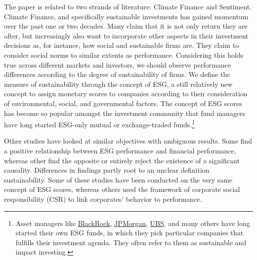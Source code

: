 \documentclass[11pt]{article}
\begin{document}
The paper is related to two strands of literature: Climate Finance and Sentiment. Climate Finance, and specifically sustainable investments has gained momentum over the past one or two decades. Many claim that it is not only return they are after, but increasingly also want to incorporate other aspects in their investment decisions as, for instance, how social and sustainable firms are. They claim to consider social norms to similar extents as performance. Considering this holds true across different markets and investors, we should observe performance differences according to the degree of sustainability of firms. We define the measure of sustainability through the concept of ESG, a still relatively new concept to assign monetary scores to companies according to their consideration of environmental, social, and governmental factors. The concept of ESG scores has become so popular amongst the investment community that fund managers have long started ESG-only mutual or exchange-traded funds.\footnote{Asset managers like \href{https://www.ishares.com/uk/individual/en/themes/sustainable-investing?switchLocale=y&siteEntryPassthrough=true}{BlackRock}, \href{https://www.jpmorgan.com/country/DK/en/detail/1320566638713}{JPMorgan}, \href{https://www.ubs.com/global/en/asset-management/investment-capabilities/sustainability.html}{UBS}, and many others have long started their own ESG funds, in which they pick particular companies that fulfills their investment agenda. They often refer to them as sustainable and impact investing.} 

Other studies have looked at similar objectives with ambiguous results. Some find a positive relationship between ESG performance and financial performance, whereas other find the opposite or entirely reject the existence of a significant causality. Differences in findings partly root to an unclear definition sustainability. Some of these studies have been conducted on the very same concept of ESG scores, whereas others used the framework of corporate social responsibility (CSR) to link corporates' behavior to performance.
\end{document}
